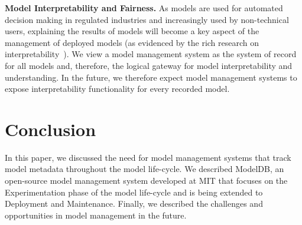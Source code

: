 \documentclass[11pt]{article}
\newcommand{\mdb}{{\sc ModelDB}\xspace}
\begin{document}
{\bf Model Interpretability and Fairness.} 
As models are used for automated decision making in regulated industries and increasingly used by non-technical users, explaining the results of models will become a key aspect of the management of deployed models (as evidenced by the rich research on interpretability~\cite{shap,DoshiKim2017Interpretability,svcca}).
We view a model management system as the system of record for all models and, therefore, the logical gateway for model interpretability and understanding.
In the future, we therefore expect model management systems to expose interpretability functionality for every recorded model.

\section{Conclusion}
\label{sec:conclusion}
In this paper, we discussed the need for model management systems that track model metadata throughout the model life-cycle.
We described \mdb, an open-source model management system developed at MIT that focuses on the Experimentation phase of the model life-cycle and is being extended to Deployment and Maintenance.
Finally, we described the challenges and opportunities in model management in the future.
\end{document}
